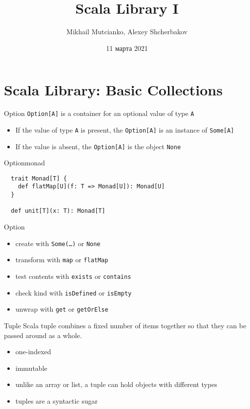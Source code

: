 \documentclass[aspectratio=169]{beamer}
\title{Scala Library I}
\author{Mikhail Mutcianko, Alexey Shcherbakov}
\institute{СПБгУ, СП}
\date{11 марта 2021}
\begin{document}
\frame{\titlepage}

\section{Scala Library: Basic Collections}

\begin{frame}{Option}
\texttt{Option[A]} is a container for an optional value of type \texttt{A}
\vspace{1em}
\begin{itemize}
  \item If the value of type \texttt{A} is present, the \texttt{Option[A]} is an instance of \texttt{Some[A]}
  \item If the value is absent, the \texttt{Option[A]} is the object \texttt{None}
\end{itemize}
\end{frame}

\begin{frame}[fragile]{Option}{monad}
\begin{verbatim}
  trait Monad[T] {
    def flatMap[U](f: T => Monad[U]): Monad[U]
  }

  def unit[T](x: T): Monad[T]
\end{verbatim}
\end{frame}

\begin{frame}{Option}
\begin{itemize}
  \item create with \texttt{Some(\ldots)} or \texttt{None}
  \item transform with \texttt{map} or \texttt{flatMap}
  \item test contents with \texttt{exists} or \texttt{contains}
  \item check kind with \texttt{isDefined} or \texttt{isEmpty}
  \item unwrap with \texttt{get} or \texttt{getOrElse}
\end{itemize}
\end{frame}

\begin{frame}[fragile]{Tuple}
  Scala tuple combines a fixed number of items together so that they can be passed around as a
  whole.
  \begin{itemize}
    \item one-indexed
    \item immutable
    \item unlike an array or list, a tuple can hold objects with different types
    \item tuples are a syntactic sugar
  \end{itemize}
  \pause
\end{frame}
\end{document}
